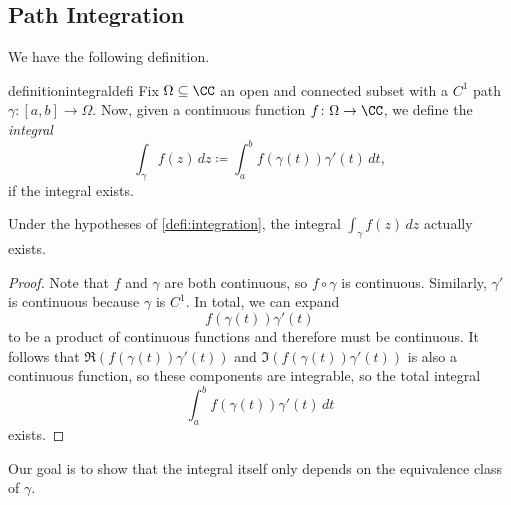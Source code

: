 \subsection{Path Integration}
We have the following definition.
\begin{restatable}[Integration]{definition}{integraldefi} \label{defi:integration}
	Fix $\Omega\subseteq\CC$ an open and connected subset with a $C^1$ path $\gamma\colon [a,b]\to\Omega$. Now, given a continuous function $f\colon \Omega\to\CC$, we define the \textit{integral}
	\[\int_\gamma f(z)\,dz\coloneqq \int_a^bf(\gamma(t))\gamma'(t)\,dt,\]
	if the integral exists.
\end{restatable}
\begin{lemma}
	Under the hypotheses of \autoref{defi:integration}, the integral $\int_\gamma f(z)\,dz$ actually exists.
\end{lemma}
\begin{proof}
	Note that $f$ and $\gamma$ are both continuous, so $f\circ\gamma$ is continuous. Similarly, $\gamma'$ is continuous because $\gamma$ is $C^1$. In total, we can expand
	\[f(\gamma(t))\gamma'(t)\]
	to be a product of continuous functions and therefore must be continuous. It follows that $\Re(f(\gamma(t))\gamma'(t))$ and $\Im(f(\gamma(t))\gamma'(t))$ is also a continuous function, so these components are integrable, so the total integral
	\[\int_a^bf(\gamma(t))\gamma'(t)\,dt\]
	exists.
\end{proof}
Our goal is to show that the integral itself only depends on the equivalence class of $\gamma$.


